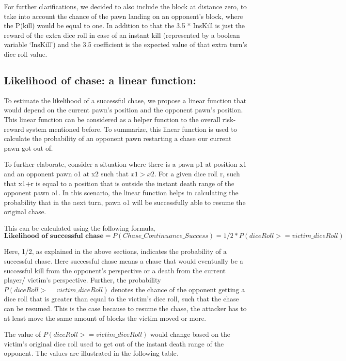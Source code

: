 \documentclass{article} %
\begin{document}
For further clarifications, we decided to also include the block at distance zero, to take into account the chance of the pawn landing on an opponent’s block, where the P(kill) would be equal to one. In addition to that the 3.5 * InsKill is just the reward of the extra dice roll in case of an instant kill (represented by a boolean variable ‘InsKill’) and the 3.5 coefficient is the expected value of that extra turn’s dice roll value. 

\subsection{Likelihood of chase: a linear function:}
To estimate the likelihood of a successful chase, we propose a linear function that would depend on the current pawn’s position and the opponent pawn’s position. This linear function can be considered as a helper function to the overall risk-reward system mentioned before. To summarize, this linear function is used to calculate the probability of an opponent pawn restarting a chase our current pawn got out of.

To further elaborate, consider a situation where there is a pawn p1 at position x1 and an opponent pawn o1 at x2 such that $x1>x2$. For a given dice roll r, such that x1+r is equal to a position that is outside the instant death range of the opponent pawn o1. In this scenario, the linear function helps in calculating the probability that in the next turn, pawn o1 will be successfully able to resume the original chase.

This can be calculated using the following formula,
$
\textbf{Likelihood of successful chase} = P(Chase\_Continuance\_Success) = 1/2 * P(diceRoll >= victim\_diceRoll)
$

Here, 1/2, as explained in the above sections, indicates the probability of a successful chase. Here successful chase means a chase that would eventually be a successful kill from the opponent’s perspective or a death from the current player/ victim’s perspective. Further, the probability $P(diceRoll >= victim\_diceRoll)$ denotes the chance of the opponent getting a dice roll that is greater than equal to the victim’s dice roll, such that the chase can be resumed. This is the case because to resume the chase, the attacker has to at least move the same amount of blocks the victim moved or more.

The value of $P(diceRoll >= victim\_diceRoll)$ would change based on the victim's original dice roll used to get out of the instant death range of the opponent. The values are illustrated in the following table.
\end{document}
